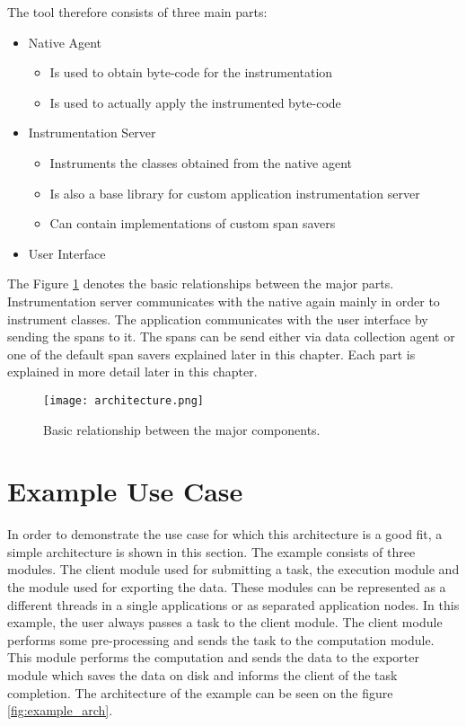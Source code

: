 The tool therefore consists of three main parts:
\begin{itemize}
	\item Native Agent
	\begin{itemize}
		\item Is used to obtain byte-code for the instrumentation
		\item Is used to actually apply the instrumented byte-code
	\end{itemize}
	\item Instrumentation Server
	\begin{itemize}
		\item Instruments the classes obtained from the native agent
		\item Is also a base library for custom application instrumentation server
		\item Can contain implementations of custom span savers
	\end{itemize}
	\item User Interface
\end{itemize}


The Figure \ref{fig:architecture} denotes the basic relationships between the major parts. Instrumentation server communicates with the native again mainly in order to instrument classes. The application communicates with the user interface by sending the spans to it. The spans can be send either via data collection agent or one of the default span savers explained later in this chapter. Each part is explained in more detail later in this chapter. \begin{figure}
	\centering
	\texttt{[image: architecture.png]}
	\caption{Basic relationship between the major components. }
	\label{fig:architecture}
\end{figure}

\section{Example Use Case}
\label{design:use_case}
In order to demonstrate the use case for which this architecture is a good fit, a simple architecture is shown in this section. The example consists of three modules. The client module used for submitting a task, the execution module and the module used for exporting the data. These modules can be represented as a different threads in a single applications or as separated application nodes. In this example, the user always passes a task to the client module. The client module performs some pre-processing and sends the task to the computation module. This module performs the computation and sends the data to the exporter module which saves the data on disk and informs the client of the task completion. The architecture of the example can be seen on the figure \ref{fig:example_arch}.

